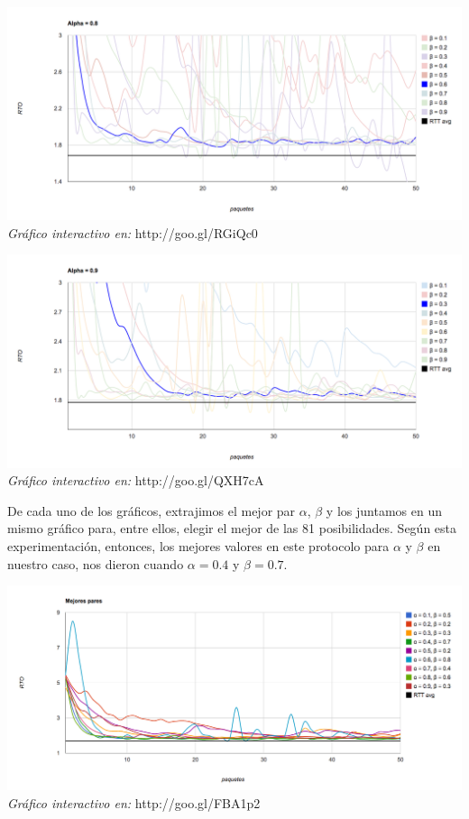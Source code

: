 \begin{center}
	\includegraphics[scale=0.35]{graphics/rto_vs_paquetes_a_8.png}
	\textit{Gráfico interactivo en:} http://goo.gl/RGiQc0
\end{center}

\begin{center}
	\includegraphics[scale=0.35]{graphics/rto_vs_paquetes_a_9.png}
	\textit{Gráfico interactivo en:} http://goo.gl/QXH7cA
\end{center}

De cada uno de los gráficos, extrajimos el mejor par $\alpha$, $\beta$ y los juntamos en un mismo gráfico para, entre ellos, elegir el mejor de las 81 posibilidades. Según esta experimentación, entonces, los mejores valores en este protocolo para $\alpha$ y $\beta$ en nuestro caso, nos dieron cuando $\alpha = 0.4$ y $\beta = 0.7$.

\begin{center}
	\includegraphics[scale=0.35]{graphics/best_pairs.png}
	\textit{Gráfico interactivo en:} http://goo.gl/FBA1p2
\end{center}

